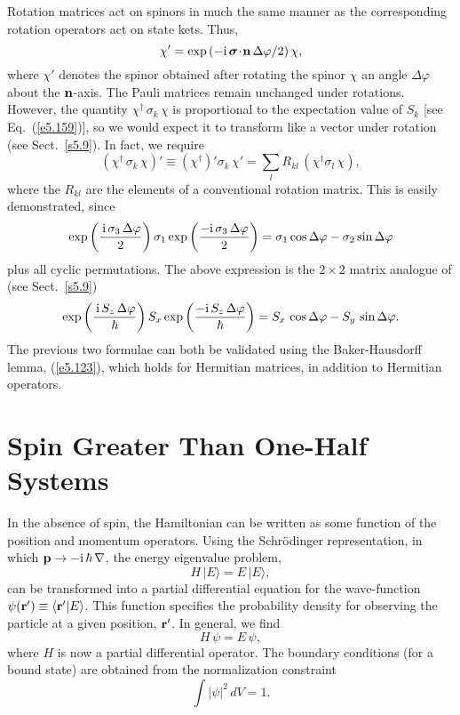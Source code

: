Rotation matrices act on spinors in much the same manner as the corresponding
rotation operators act on state kets. Thus,
\begin{equation}
\chi' = \exp\left(-{\rm i} \,\mbox{\boldmath$\sigma$}\!\cdot\!{\bf n}\,\Delta\varphi/2\right) \chi,
\end{equation}
where $\chi'$ denotes the  spinor  obtained after rotating the spinor
$\chi$ an angle $\Delta\varphi$ about the ${\bf n}$-axis. 
The Pauli matrices remain unchanged under rotations. 
However, the quantity $\chi^\dagger \,\sigma_k \,\chi$ is proportional to the expectation
value of $S_k$ [see Eq.~(\ref{e5.159})], so we would expect it to transform like a
vector under rotation (see Sect.~\ref{s5.9}). In fact, we
require
\begin{equation}
(\chi^\dagger \,\sigma_k \,\chi)' \equiv (\chi^\dagger)' \sigma_k\, \chi' = \sum_l R_{kl}\,
(\chi^\dagger \sigma_l\, \chi),
\end{equation}
where the $R_{kl}$ are the elements of a conventional rotation matrix. This
is easily demonstrated, since
\begin{equation}
\exp\left(\frac{\,{\rm i}\,\sigma_3 \,\Delta\varphi}{2}\right) \sigma_1 \exp\left(
\frac{-{\rm i}\,\sigma_3 \,\Delta\varphi}{2}\right) = \sigma_1 \cos\Delta\varphi
-\sigma_2 \sin\Delta\varphi
\end{equation}
plus all cyclic permutations. The above expression is the $2\times 2$ matrix analogue
of (see Sect.~\ref{s5.9})
\begin{equation}
\exp\left(\frac{\,{\rm i}\,S_z \,\Delta\varphi}{\hbar}\right) S_x \exp\left(
\frac{-{\rm i}\,S_z \,\Delta\varphi}{\hbar}\right) = S_x\,  \cos\Delta\varphi
-S_y\, \sin\Delta\varphi.
\end{equation}
The previous two formulae can both be validated using the Baker-Hausdorff lemma,
(\ref{e5.123}), which holds for Hermitian matrices, in addition to Hermitian operators. 

\section{Spin Greater Than One-Half Systems}
In the absence of spin, the Hamiltonian can be written as some function
of the position and momentum operators. Using the Schr\"{o}dinger representation,
in which ${\bf p} \rightarrow -{\rm i}\,\hbar\,\nabla$, the energy eigenvalue
problem,
\begin{equation}
H\,|E\rangle = E\,|E\rangle,
\end{equation}
can be transformed into a partial differential equation for the wave-function
$\psi({\bf r}') \equiv \langle {\bf r'}|E\rangle$. This function specifies the
probability density for observing the particle at a given position, ${\bf r}'$. 
In general, we find
\begin{equation}
H \,\psi = E\, \psi,
\end{equation}
where $H$ is now a partial differential operator.
 The boundary conditions (for a bound state) are obtained
 from the normalization constraint
\begin{equation}
\int |\psi|^2\, dV = 1.
\end{equation}

